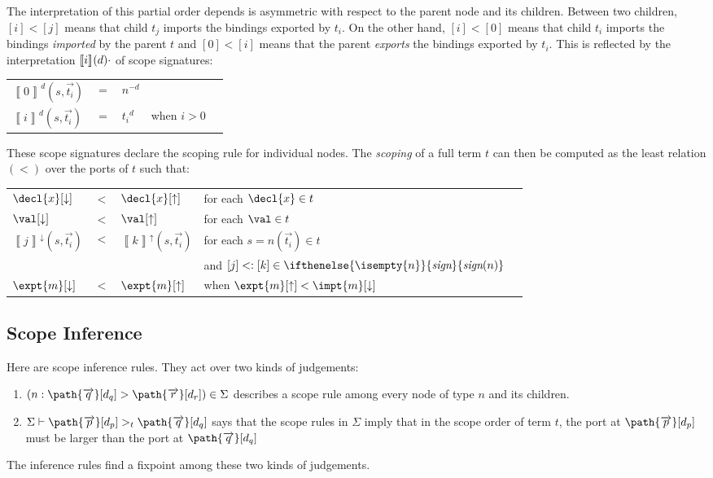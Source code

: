 \documentclass[preprint]{sigplanconf}
\makeatletter
\newenvironment{jtable}
  {\begin{center}\begin{tabular}{l c l @{\quad}l l}}
  {\end{tabular}\end{center}}
\theoremstyle{plain}
\newcommand{\ifempty}[3]{\ifthenelse{\isempty{#1}}{#2}{#3}}
\newcommand{\constr}[2]{\ifempty{#2}{#1}{#1(#2)}}
\newcommand{\constrit}[2]{\constr{\textit{#1}}{#2}}
\newcommand{\node}[2]{#1(#2)}
\newcommand{\port}[2]{{#1}^{#2}}
\newcommand{\negport}[1]{-{#1}}
\newcommand{\im}{\downarrow}
\newcommand{\ex}{\uparrow}
\newcommand{\interpSign}[3][\empty]{\port{\left\llbracket #2 \right\rrbracket}{#1}(#3)}
\newcommand{\sign}[1]{\constrit{sign}{#1}}
\newcommand{\seq}[1]{\overrightarrow{#1}}
\makeatother
\begin{document}
The interpretation of this partial order depends is asymmetric with
respect to the parent node and its children. Between two children,
$[i] < [j]$ means that child $t_j$ imports the bindings exported by
$t_i$. On the other hand, $[i] < [0]$ means that child $t_i$ imports
the bindings \emph{imported} by the parent $t$ and $[0] < [i]$ means
that the parent \emph{exports} the bindings exported by $t_i$. This is
reflected by the interpretation $\interpSign{i}{d}{\cdot}$ of scope
signatures:
\begin{jtable}
$\interpSign[d]{0}{s, \seq{t_i}}$
  &$=$& $\port{n}{\negport{d}}$ \\
$\interpSign[d]{i}{s, \seq{t_i}}$
  &$=$& $\port{t_i}{d}$
  &when $i > 0$
\end{jtable}

These scope signatures declare the scoping rule for individual nodes.
The \emph{scoping} of a full term $t$ can then be computed as the least
relation $(<)$ over the ports of $t$ such that:
\begin{jtable}
$\decl{x}[\im]$ &$<$& $\decl{x}[\ex]$
  &for each $\decl{x} \in t$ \\
$\val[\im]$ &$<$& $\val[\ex]$
  &for each $\val \in t$ \\
$\interpSign[\im]{j}{s, \seq{t_i}}$
  &$<$& $\interpSign[\ex]{k}{s, \seq{t_i}}$
  &for each $s = \node{n}{\seq{t_i}} \in t$ \\
&&&and $[j] <: [k] \in \sign{n}$ \\
$\expt{m}[\im]$ &$<$& $\expt{m}[\ex]$
  &when $\expt{m}[\ex] < \impt{m}[\im]$ \\
\end{jtable}


\subsection{Scope Inference}

Here are scope inference rules.
They act over two kinds of judgements:
\begin{enumerate}
\item $(n : \path{\seq{q}}[d_q] > \path{\seq{r}}[d_r]) \in \Sigma$
  describes a scope rule among every node of type $n$ and its
  children.
\item $\Sigma \vdash \path{\seq{p}}[d_p] >_t \path{\seq{q}}[d_q]$ says
  that the scope rules in $\Sigma$ imply that in the scope order of
  term $t$, the port at $\path{\seq{p}}[d_p]$ must be larger than the
  port at $\path{\seq{q}}[d_q]$
\end{enumerate}
The inference rules find a fixpoint among these two kinds of judgements.
\end{document}
